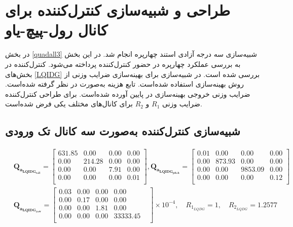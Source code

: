 \section{طراحی و شبیه‌سازی کنترل‌کننده برای کانال رول-پیچ-یاو}\label{roll_pitch_yaw_lqidg_section}
در بخش
\ref{quadall3}
شبیه‌سازی سه درجه آزادی استند چهارپره انجام شد. در این بخش به بررسی عملکرد چهارپره در حضور کنترل‌کننده  پرداخته می‌شود. کنترل‌کننده  در بخش‌های
\ref{LQIDG}
بررسی شده است.
 در شبیه‌سازی برای بهینه‌سازی ضرایب وزنی  از روش بهینه‌سازی
 \cite{Karimi2010}
استفاده شده‌است.
تابع هزینه  به‌صورت
در نظر گرفته شده‌است. ضرایب وزنی خروجی بهینه‌سازی در پایین آورده شده‌است. برای طراحی کنترل‌کننده
ضرایب وزنی
$R_1$
و
$R_2$
برای کانال‌های مختلف یکی فرض شده‌است.
\subsection{شبیه‌سازی کنترل‌کننده به‌صورت سه کانال تک ورودی}


\begin{equation*}
	\begin{split}
				&\boldsymbol{Q_{a_{LQIDG_{roll}}}} = \begin{bmatrix}
			631.85 & 0.00 & 0.00 & 0.00  \\ 
			0.00 & 214.28 & 0.00 & 0.00  \\ 
			0.00 & 0.00 & 7.91 & 0.00  \\ 
			0.00 & 0.00 & 0.00 & 0.01  \\ 
		\end{bmatrix} ,
		\boldsymbol{Q_{a_{LQIDG_{pitch}}}} = \begin{bmatrix}
			0.01 & 0.00 & 0.00 & 0.00  \\
			0.00 & 873.93 & 0.00 & 0.00  \\ 
			0.00 & 0.00 & 9853.09 & 0.00 \\ 
			0.00 & 0.00 & 0.00 & 0.12  \\ 
		\end{bmatrix}\\
			&\boldsymbol{Q_{a_{LQIDG_{yaw}}}}  = \begin{bmatrix}
0.03 & 0.00 & 0.00 & 0.00 & \\ 
0.00 & 0.17 & 0.00 & 0.00 & \\ 
0.00 & 0.00 & 1.81 & 0.00 & \\ 
0.00 & 0.00 & 0.00 & 33333.45 & \\
	\end{bmatrix}\times 10^{-4}, \quad R_{1_{LQDG}} = 1, \quad R_{2_{LQDG}} = 1.2577
	\end{split}
\end{equation*}

